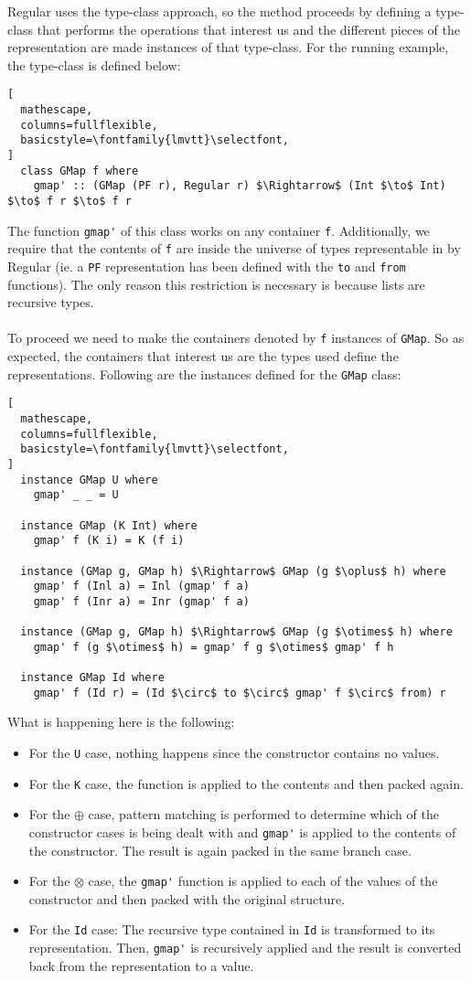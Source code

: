 \documentclass[8pt]{extarticle}
\begin{document}
Regular uses the type-class approach, so the method proceeds by defining a type-class that performs the operations that interest us and the different pieces of the representation are made instances of that type-class. For the running example, the type-class is defined below:
\begin{lstlisting}[
  mathescape,
  columns=fullflexible,
  basicstyle=\fontfamily{lmvtt}\selectfont,
]
  class GMap f where
    gmap' :: (GMap (PF r), Regular r) $\Rightarrow$ (Int $\to$ Int) $\to$ f r $\to$ f r
\end{lstlisting}
The function \verb+gmap'+ of this class works on any container \verb+f+. Additionally, we require that the contents of \verb+f+ are inside the universe of types representable in by Regular (ie. a \verb+PF+ representation has been defined with the \verb+to+ and \verb+from+ functions). The only reason this restriction is necessary is because lists are recursive types.
\\\\
To proceed we need to make the containers denoted by \verb+f+ instances of \verb+GMap+. So as expected, the containers that interest us are the types used define the representations. Following are the instances defined for the \verb+GMap+ class:
\begin{lstlisting}[
  mathescape,
  columns=fullflexible,
  basicstyle=\fontfamily{lmvtt}\selectfont,
]
  instance GMap U where
    gmap' _ _ = U

  instance GMap (K Int) where
    gmap' f (K i) = K (f i)

  instance (GMap g, GMap h) $\Rightarrow$ GMap (g $\oplus$ h) where
    gmap' f (Inl a) = Inl (gmap' f a)
    gmap' f (Inr a) = Inr (gmap' f a)

  instance (GMap g, GMap h) $\Rightarrow$ GMap (g $\otimes$ h) where
    gmap' f (g $\otimes$ h) = gmap' f g $\otimes$ gmap' f h

  instance GMap Id where
    gmap' f (Id r) = (Id $\circ$ to $\circ$ gmap' f $\circ$ from) r
\end{lstlisting}
What is happening here is the following:
\begin{itemize}
\item For the \verb+U+ case, nothing happens since the constructor contains no values.
\item For the \verb+K+ case, the function is applied to the contents and then packed again.
\item For the $\oplus$ case, pattern matching is performed to determine which of the constructor cases is being dealt with and \verb+gmap'+ is applied to the contents of the constructor. The result is again packed in the same branch case.
\item For the $\otimes$ case, the \verb+gmap'+ function is applied to each of the values of the constructor and then packed with the original structure.
\item For the \verb+Id+ case: The recursive type contained in \verb+Id+ is transformed to its representation. Then, \verb+gmap'+ is recursively applied and the result is converted back from the representation to a value.
\end{itemize}
\end{document}
